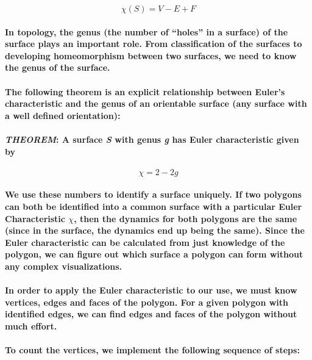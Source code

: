 \documentclass{report}
\begin{document}
\begin{equation}
\mathit{\chi(S)=V-E+F}
\end{equation}

\paragraph{In topology, the genus (the number of “holes” in a surface) of the surface plays an important role. From classification of the surfaces to developing homeomorphism between two surfaces, we need to know the genus of the surface.}

\paragraph{The following theorem is an explicit relationship between Euler’s characteristic and the genus of an orientable surface (any surface with a well defined orientation):}

\paragraph{\textit{THEOREM}: A surface \textit{S} with genus \textit{g} has Euler characteristic given by}

\begin{equation}
\chi=2-2g
\end{equation}

\paragraph{We use these numbers to identify a surface uniquely. If two polygons can both be identified into a common surface with a particular Euler Characteristic $\chi$, then the dynamics for both polygons are the same (since in the surface, the dynamics end up being the same). Since the Euler characteristic can be calculated from just knowledge of the polygon, we can figure out which surface a polygon can form without any complex visualizations.}

\paragraph{In order to apply the Euler characteristic to our use, we must know vertices, edges and faces of the polygon. For a given polygon with identified edges, we can find edges and faces of the polygon without much effort.}

\paragraph{To count the vertices, we implement the following sequence of steps:}
\end{document}
